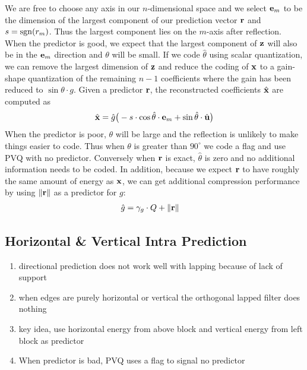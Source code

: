 \documentclass[conference, 10pt]{IEEEtran}
\def\sgn{\mathop{\rm sgn}}
\begin{document}
We are free to choose any axis in our $n$-dimensional space and we select
 ${\bf e}_m$
 to be the dimension of the largest component of our prediction vector
 ${\bf r}$ and $s = \sgn(r_m)$.
Thus the largest component lies on the $m$-axis after reflection.
When the predictor is good, we expect that the largest component of ${\bf z}$
 will also be in the ${\bf e}_m$ direction and $\theta$ will be small.
If we code $\hat{\theta}$ using scalar quantization, we can remove the largest
 dimension of ${\bf z}$ and reduce the coding of ${\bf x}$ to a gain-shape
 quantization of the remaining $n-1$ coefficients where the gain has been
 reduced to $\sin\theta\cdot g$.
Given a predictor ${\bf r}$, the reconstructed coefficients $\hat{{\bf x}}$
 are computed as
\begin{align}
\hat{{\bf x}} = \hat{g}\big(-s\cdot\cos\hat{\theta}\cdot {\bf e}_m +
 \sin\hat{\theta}\cdot\hat{{\bf u}}\big)
\end{align}
When the predictor is poor, $\theta$ will be large and the reflection is
 unlikely to make things easier to code.
Thus when $\theta$ is greater than $90^{\circ}$ we code a flag and use PVQ with
 no predictor.
Conversely when ${\bf r}$ is exact, $\hat{\theta}$ is zero and no additional
 information needs to be coded.
In addition, because we expect ${\bf r}$ to have roughly the same amount of
 energy as ${\bf x}$, we can get additional compression performance by using
 $\left\|{\bf r}\right\|$ as a predictor for $g$:
\begin{align}
\hat{g} & = \gamma_g\cdot Q + \left\|{\bf r}\right\|
\end{align}

\subsection{Horizontal \& Vertical Intra Prediction}
\label{sec:hv}

\begin{enumerate}
\item directional prediction does not work well with lapping because of lack of support
\item when edges are purely horizontal or vertical the orthogonal lapped filter does nothing
\item key idea, use horizontal energy from above block and vertical energy from left block as predictor
\item When predictor is bad, PVQ uses a flag to signal no predictor
\end{enumerate}
\end{document}
